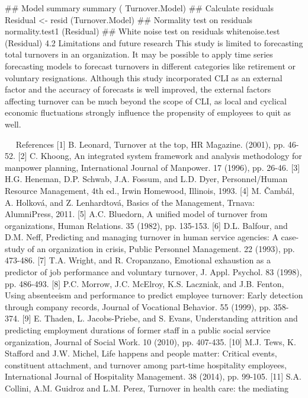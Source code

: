 ## Model summary
summary ( Turnover.Model)
## Calculate residuals
Residual <- resid (Turnover.Model)
## Normality test on residuals
normality.test1 (Residual)
## White noise test on residuals
whitenoise.test (Residual)
4.2    Limitations and future research
This study is limited to forecasting total turnovers in an organization. It may be possible to apply time series forecasting models to forecast turnovers in different categories like retirement or voluntary resignations. Although this study incorporated CLI as an external factor and the accuracy of forecasts is well improved, the external factors affecting turnover can be much beyond the scope of CLI, as local and cyclical economic fluctuations strongly influence the propensity of employees to quit  as well.

 
References 
 [1] B. Leonard, Turnover at the top, HR Magazine. (2001), pp. 46-52.
 [2] C. Khoong, An integrated system framework and analysis methodology for manpower  
       planning, International Journal of Manpower. 17 (1996), pp. 26-46.
 [3] H.G. Heneman, D.P. Schwab, J.A. Fossum, and L.D. Dyer, Personnel/Human Resource    Management, 4th ed., Irwin Homewood, Illinois, 1993.
 [4] M. Čambál, A. Holková, and Z. Lenhardtová, Basics of the Management, Trnava:  
       AlumniPress, 2011.
 [5] A.C. Bluedorn, A unified model of turnover from organizations, Human Relations. 35 (1982), pp. 135-153.
 [6] D.L. Balfour, and D.M. Neff, Predicting and managing turnover in human service  
       agencies: A case-study of an organization in crisis, Public Personnel Management. 22  
       (1993), pp. 473-486.
 [7] T.A. Wright, and R. Cropanzano, Emotional exhaustion as a predictor of job  
       performance and voluntary turnover, J. Appl. Psychol. 83 (1998), pp. 486-493.
 [8] P.C. Morrow, J.C. McElroy, K.S. Laczniak, and J.B. Fenton, Using absenteeism and  
       performance to predict employee turnover: Early detection through company records,  
       Journal of Vocational Behavior. 55 (1999), pp. 358-374.
 [9] E. Thaden, L. Jacobs-Priebe, and S. Evans, Understanding attrition and predicting  
       employment durations of former staff in a public social service organization, Journal of  
       Social Work. 10 (2010), pp. 407-435.
[10] M.J. Tews, K. Stafford and J.W. Michel, Life happens and people matter: Critical  
        events, constituent attachment, and turnover among part-time hospitality employees, 
        International Journal of Hospitality Management. 38 (2014), pp. 99-105.
[11] S.A. Collini, A.M. Guidroz and L.M. Perez, Turnover in health care: the mediating 
